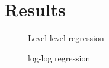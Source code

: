 
\section{Results}
\begin{figure}[!htbp]
\caption{Level-level regression}
\centering

\end{figure}
%
\begin{figure}[!htbp]
\caption{log-log regression}
\centering

\end{figure}















